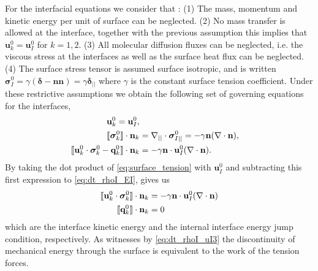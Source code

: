 
For the interfacial equations we consider that :
(1) The mass, momentum and kinetic energy per unit of surface can be neglected.
(2) No mass transfer is allowed at the interface, together with the previous assumption this implies that $\textbf{u}_k^0 = \textbf{u}_I^0$ for $k = 1,2$. 
(3) All molecular diffusion fluxes can be neglected, i.e. the viscous stress at the interfaces as well as the surface heat flux can be neglected.
(4) The surface stress tensor is assumed surface isotropic, and is written $\bm{\sigma}_I^0  = \gamma (\bm\delta - \textbf{nn}) = \gamma \bm\delta_{||}$ where $\gamma$ is the constant surface tension coefficient.
Under these restrictive assumptions we obtain the following set of governing equations for the interfaces,
\begin{align}
    \label{eq:dt_rho_I}
    \textbf{u}_k^0 = \textbf{u}_I^0, \\
    \llbracket \bm{\sigma}_k^0 \rrbracket \cdot \textbf{n}_k 
    &=
    \mathbf{\nabla}_{||}\cdot\bm\sigma^0_{I||}
    =
    -\gamma\textbf{n}(\mathbf{\nabla}\cdot \textbf{n}),
    \label{eq:surface_tension}\\
    \label{eq:dt_rhoI_EI}
    \llbracket \textbf{u}_k^0 \cdot \bm{\sigma}_k^0 - \textbf{q}_k^0 \rrbracket \cdot \textbf{n}_k
    &=
    -\gamma\textbf{n}\cdot \textbf{u}_{I}^0(\mathbf{\nabla}\cdot \textbf{n}).
\end{align}
By taking the dot product of \ref{eq:surface_tension} with $\textbf{u}_I^0$ and subtracting this first expression to \ref{eq:dt_rhoI_EI}, gives us
\begin{align}
    \label{eq:dt_rhoI_uI3}
    \llbracket \textbf{u}_k^0 \cdot \bm{\sigma}_k^0 \rrbracket \cdot \textbf{n}_k
    &=
    -\gamma\textbf{n}\cdot \textbf{u}_{I}^0(\mathbf{\nabla}\cdot \textbf{n})\\
    \label{eq:dt_rhoIe_I}
    \llbracket  \textbf{q}_k^0 \rrbracket \cdot \textbf{n}_k
    &= 
     0
\end{align}
which are the interface kinetic energy and the internal interface energy jump condition, respectively. 
As witnesses by \ref{eq:dt_rhoI_uI3} the discontinuity of mechanical energy through the surface is equivalent to the work of the tension forces. 

